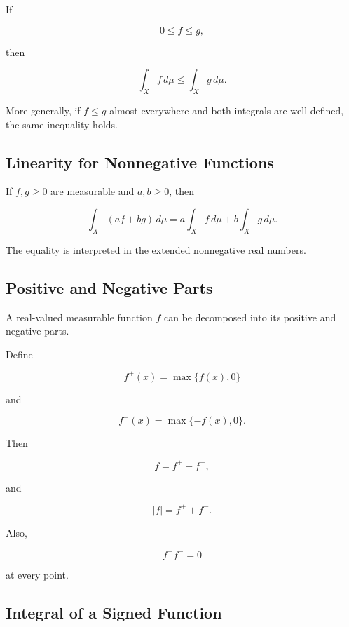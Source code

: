 If

\[
0\leq f\leq g,
\]

then

\[
\boxed{
\int_X f\,d\mu
\leq
\int_X g\,d\mu.
}
\]

More generally, if \(f\leq g\) almost everywhere and both integrals are
well defined, the same inequality holds.

\subsection{Linearity for Nonnegative Functions}
\label{subsec:linearity-nonnegative-integrals}

If \(f,g\geq0\) are measurable and \(a,b\geq0\), then

\[
\boxed{
\int_X(af+bg)\,d\mu
=
a\int_Xf\,d\mu
+
b\int_Xg\,d\mu.
}
\]

The equality is interpreted in the extended nonnegative real numbers.

\subsection{Positive and Negative Parts}
\label{subsec:positive-negative-parts}

A real-valued measurable function \(f\) can be decomposed into its positive
and negative parts.

Define

\[
\boxed{
f^+(x)
=
\max\{f(x),0\}
}
\]

and

\[
\boxed{
f^-(x)
=
\max\{-f(x),0\}.
}
\]

Then

\[
\boxed{
f=f^+-f^-,
}
\]

and

\[
\boxed{
|f|=f^++f^-.
}
\]

Also,

\[
f^+f^-=0
\]

at every point.

\subsection{Integral of a Signed Function}
\label{subsec:signed-lebesgue-integral}

